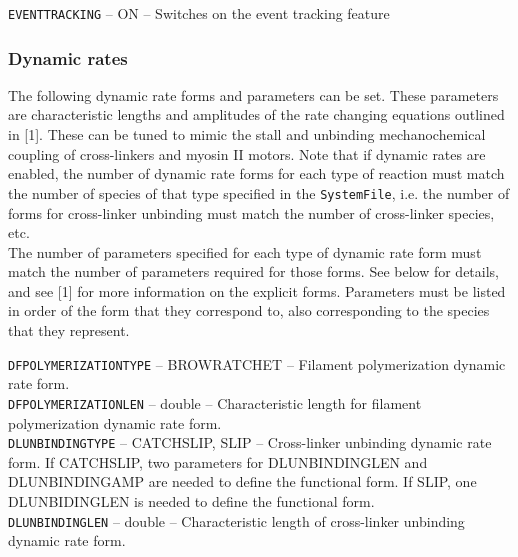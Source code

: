 \documentclass[11pt, oneside]{article}   	%
\begin{document}
       \noindent \texttt{EVENTTRACKING} -- ON -- Switches on the event tracking feature \\
       
     

\normalsize

\subsubsection{Dynamic rates}

The following dynamic rate forms and parameters can be set. These parameters are characteristic lengths and amplitudes of the rate changing equations outlined in [1]. These can be tuned to mimic the stall and unbinding mechanochemical coupling of cross-linkers and myosin II motors. Note that if dynamic rates are enabled, the number of dynamic rate forms for each type of reaction must match the number of species of that type specified in the \texttt{SystemFile}, i.e. the number of forms for cross-linker unbinding must match the number of cross-linker species, etc.\\

\noindent The number of parameters specified for each type of dynamic rate form must match the number of parameters required for those forms. See below for details, and see [1] for more information on the explicit forms. Parameters must be listed in order of the form that they correspond to, also corresponding to the species that they represent.\\

\small

  \noindent\texttt{DFPOLYMERIZATIONTYPE} -- BROWRATCHET -- Filament polymerization dynamic rate form. \\
  
  \noindent\texttt{DFPOLYMERIZATIONLEN} -- double -- Characteristic length for filament polymerization dynamic rate form. \\
   
  \noindent\texttt{DLUNBINDINGTYPE} -- CATCHSLIP, SLIP -- Cross-linker unbinding dynamic rate form. 
  If CATCHSLIP, two
  parameters for DLUNBINDINGLEN and DLUNBINDINGAMP are needed to define the functional form. 
  If SLIP, one 
  DLUNBIDINGLEN is needed to define the functional form. \\
   
  \noindent\texttt{DLUNBINDINGLEN} -- double -- Characteristic length of cross-linker unbinding dynamic rate form. \\
   
\end{document}
